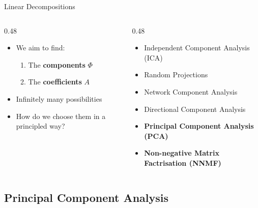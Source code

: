 \documentclass[aspectratio=169]{beamer}
\begin{document}
\begin{frame}{Linear Decompositions}    
  \begin{columns}
    \begin{column}{0.48\textwidth}
      \begin{itemize}
        \item We aim to find:
        \begin{enumerate}
          \item The \textbf{components} $\Phi$
          \item The \textbf{coefficients} $A$
        \end{enumerate}
        \item Infinitely many possibilities
        \item How do we choose them in a principled way?
      \end{itemize}
    \end{column}
    \begin{column}{0.48\textwidth}
      \begin{itemize}
        \item Independent Component Analysis (ICA)
        \item Random Projections
        \item Network Component Analysis
        \item Directional Component Analysis
        \pause
        \item \textbf{Principal Component Analysis (PCA)}
        \item \textbf{Non-negative Matrix Factrisation (NNMF)}
      \end{itemize}
    \end{column}
  \end{columns}
\end{frame}

\subsection{Principal Component Analysis}
\end{document}
